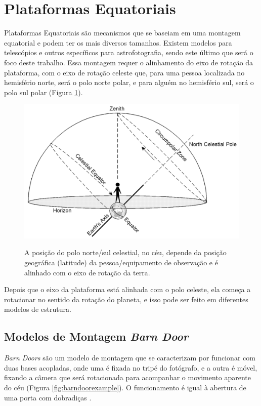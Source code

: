 \section{Plataformas Equatoriais}

Plataformas Equatoriais são mecanismos que se baseiam em uma montagem equatorial e podem ter os mais diversos tamanhos. Existem modelos para telescópios e outros específicos para astrofotografia, sendo este último que será o foco deste trabalho. Essa montagem requer o alinhamento do eixo de rotação da plataforma, com o eixo de rotação celeste que, para uma pessoa localizada no hemisfério norte, será o polo norte polar, e para alguém no hemisfério sul, será o polo sul polar (Figura \ref{fig:celestialchart}). 

\begin{figure}[!htb]
	\centering
	\caption{A posição do polo norte/sul celestial, no céu, depende da posição geográfica (latitude) da pessoa/equipamento de observação e é alinhado com o eixo de rotação da terra.}
	\includegraphics[width=0.8\linewidth]{figuras/celestialchart}
	\label{fig:celestialchart}
\end{figure}

Depois que o eixo da plataforma está alinhada com o polo celeste, ela começa a rotacionar no sentido da rotação do planeta, e isso pode ser feito em diferentes modelos de estrutura.

\subsection[Modelos de Montagem]{Modelos de Montagem \textit{Barn Door}}
\textit{Barn Doors} são um modelo de montagem que se caracterizam por funcionar com duas bases acopladas, onde uma é fixada no tripé do fotógrafo, e a outra é móvel, fixando a câmera que será rotacionada para acompanhar o movimento aparente do céu (Figura \ref{fig:barndoorexample}). O funcionamento é igual à abertura de uma porta com dobradiças \cite{site:pentaxBarnDoor}. 


